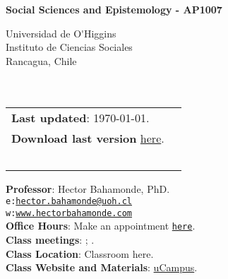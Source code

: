 \documentclass[letterpaper]{article}
\def\name{Social Sciences and Epistemology - AP1007}
\begin{document}

\centerline{\huge \bf \name}

\vspace{0.25in}

\begin{minipage}{0.45\linewidth}
 Universidad de O\'\unskip Higgins \\
  Instituto de Ciencias Sociales \\
  Rancagua, Chile\\
  \\
  \\

\end{minipage}
\hspace{4cm}\begin{minipage}{0.45\linewidth}
  \begin{tabular}{ll}
{\bf Last updated}: \today. \\
 {\bf Download last version} \href{https://github.com/hbahamonde/Comparative_Politics_UGRAD/raw/master/Bahamonde_Comparative_Politics_Syllabus_UGRAD.pdf}{here}.\\
   {\bf {\color{red}{\scriptsize Not intended as a definitive version}}} %
    \\
    \\
    \\
    \\
    \\
  \end{tabular}
\end{minipage}

\vspace{-5mm}
{\bf Professor}: Hector Bahamonde, PhD.\\
\texttt{e:}\href{mailto:hector.bahamonde@uoh.cl}{\texttt{hector.bahamonde@uoh.cl}}\\
\texttt{w:}\href{http://www.hectorbahamonde.com}{\texttt{www.hectorbahamonde.com}}\\
{\bf Office Hours}: Make an appointment \href{https://calendly.com/bahamonde/officehours}{\texttt{here}}.\\

\vspace{1mm}
{\bf Class meetings}: {\unskip}; {\unskip}.\\
{\bf Class Location}: {\color{red}Classroom here}.\\
{\bf Class Website and Materials}: \href{https://ucampus.uoh.cl/uoh/2018/2/AP1007/1/}{uCampus}.
\end{document}
